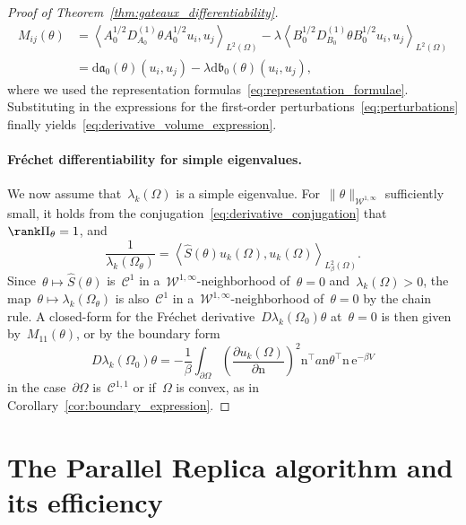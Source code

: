 \documentclass[a4]{article}
\renewcommand{\d}{\mathrm{d}}
\newcommand{\e}{\mathrm{e}}
\newcommand{\n}{\mathrm{n}}
\newcommand{\fa}{\mathfrak{a}}
\newcommand{\fb}{\mathfrak{b}}
\newcommand{\1}{\mathbbm 1}
\newcommand{\Winf}{{{\cW}^{1,\infty}}}
\newcommand{\cW}{\mathcal{W}}
\begin{document}
\begin{proof}[Proof of Theorem~\ref{thm:gateaux_differentiability}]
    \begin{equation}
        \begin{aligned}
            M_{ij}(\theta) &= \left\langle A_0^{1/2}D_{A_0}^{(1)}\theta A_0^{1/2} u_i,u_j\right\rangle_{L^2(\Omega)} - \lambda\left\langle B_0^{1/2}D_{B_0}^{(1)}\theta B_0^{1/2} u_i,u_j\right\rangle_{L^2(\Omega)}\\
            &= \d \fa_0(\theta)(u_i,u_j) - \lambda\d \fb_0(\theta)(u_i,u_j),
        \end{aligned}
    \end{equation}
    where we used the representation formulas~\eqref{eq:representation_formulae}. Substituting in the expressions for the first-order perturbations~\eqref{eq:perturbations} finally yields~\eqref{eq:derivative_volume_expression}.
    \paragraph{Fréchet differentiability for simple eigenvalues.}
    We now assume that~$\lambda_k(\Omega)$ is a simple eigenvalue.
    For~$\|\theta\|_{\Winf}$ sufficiently small, it holds from the conjugation~\eqref{eq:derivative_conjugation} that~$\rank\Pi_\theta=1$, and
    \begin{equation}
        \frac1{\lambda_k(\Omega_\theta)} = \left\langle \widehat{S}(\theta)u_k(\Omega),u_k(\Omega)\right\rangle_{L^2_\beta(\Omega)}.
    \end{equation}
    Since~$\theta\mapsto \widehat{S}(\theta)$ is~$\mathcal C^1$ in a~$\Winf$-neighborhood of~$\theta=0$ and~$\lambda_k(\Omega)>0$, the map~$\theta\mapsto\lambda_k(\Omega_\theta)$ is also~$\mathcal C^1$ in a~$\Winf$-neighborhood of~$\theta=0$ by the chain rule.
    A closed-form for the Fréchet derivative~$D\lambda_k(\Omega_0)\theta$ at~$\theta=0$ is then given by~$M_{11}(\theta)$, or by the boundary form
    \begin{equation}
        D\lambda_k(\Omega_0)\theta = -\frac1\beta\int_{\partial\Omega} \left(\frac{\partial u_k(\Omega)}{\partial\n}\right)^2\n^\top a \n \theta^\top \n\,\e^{-\beta V}
    \end{equation}
    in the case~$\partial\Omega$ is~$\mathcal C^{1,1}$ or if~$\Omega$ is convex, as in Corollary~\ref{cor:boundary_expression}.
\end{proof}
\section{The Parallel Replica algorithm and its efficiency}
\label{sec:parrep}
\end{document}

